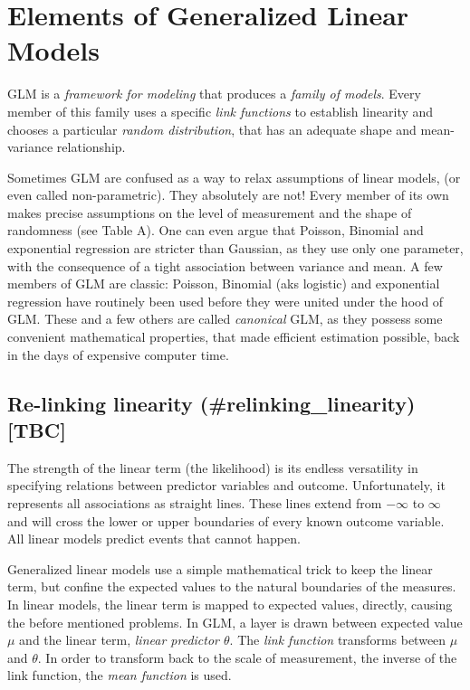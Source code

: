 \documentclass[]{svmono}
\theoremstyle{definition}
\theoremstyle{definition}
\theoremstyle{definition}
\theoremstyle{remark}
\begin{document}
\section{Elements of Generalized Linear Models}\label{glm_concepts}

GLM is a \emph{framework for modeling} that produces a \emph{family of
models}. Every member of this family uses a specific \emph{link
functions} to establish linearity and chooses a particular \emph{random
distribution}, that has an adequate shape and mean-variance
relationship.

Sometimes GLM are confused as a way to relax assumptions of linear
models, (or even called non-parametric). They absolutely are not! Every
member of its own makes precise assumptions on the level of measurement
and the shape of randomness (see Table A). One can even argue that
Poisson, Binomial and exponential regression are stricter than Gaussian,
as they use only one parameter, with the consequence of a tight
association between variance and mean. A few members of GLM are classic:
Poisson, Binomial (aks logistic) and exponential regression have
routinely been used before they were united under the hood of GLM. These
and a few others are called \emph{canonical} GLM, as they possess some
convenient mathematical properties, that made efficient estimation
possible, back in the days of expensive computer time.

\subsection{Re-linking linearity (\#relinking\_linearity)
{[}TBC{]}}\label{re-linking-linearity-relinking_linearity-tbc}

The strength of the linear term (the likelihood) is its endless
versatility in specifying relations between predictor variables and
outcome. Unfortunately, it represents all associations as straight
lines. These lines extend from \(-\infty\) to \(\infty\) and will cross
the lower or upper boundaries of every known outcome variable. All
linear models predict events that cannot happen.

Generalized linear models use a simple mathematical trick to keep the
linear term, but confine the expected values to the natural boundaries
of the measures. In linear models, the linear term is mapped to expected
values, directly, causing the before mentioned problems. In GLM, a layer
is drawn between expected value \(\mu\) and the linear term,
\emph{linear predictor \(\theta\)}. The \emph{link function} transforms
between \(\mu\) and \(\theta\). In order to transform back to the scale
of measurement, the inverse of the link function, the \emph{mean
function} is used.
\end{document}
